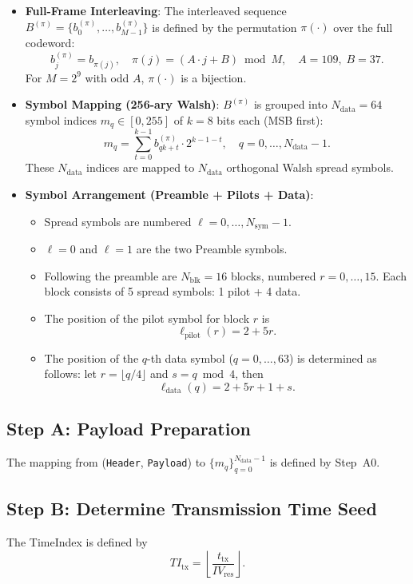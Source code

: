 \documentclass[11pt]{article}
\begin{document}
\begin{itemize}
\item \textbf{Full-Frame Interleaving}: The interleaved sequence $B^{(\pi)}=\{b^{(\pi)}_0,\dots,b^{(\pi)}_{M-1}\}$ is defined by the permutation $\pi(\cdot)$ over the full codeword:
  \[
    b^{(\pi)}_j = b_{\pi(j)},\quad \pi(j) = (A\cdot j + B)\bmod M,\quad A=109,\; B=37.
  \]
  For $M=2^9$ with odd $A$, $\pi(\cdot)$ is a bijection.

\item \textbf{Symbol Mapping (256-ary Walsh)}: $B^{(\pi)}$ is grouped into $N_{\text{data}}=64$ symbol indices $m_q\in[0,255]$ of $k=8$ bits each (MSB first):
  \[
    m_q=\sum_{t=0}^{k-1} b^{(\pi)}_{qk+t}\cdot 2^{k-1-t},\quad q=0,\dots,N_{\text{data}}-1.
  \]
  These $N_{\text{data}}$ indices are mapped to $N_{\text{data}}$ orthogonal Walsh spread symbols.

\item \textbf{Symbol Arrangement (Preamble + Pilots + Data)}:
  \begin{itemize}
  \item Spread symbols are numbered $\ell=0,\dots,N_{\text{sym}}-1$.
  \item $\ell=0$ and $\ell=1$ are the two Preamble symbols.
  \item Following the preamble are $N_{\text{blk}}=16$ blocks, numbered $r=0,\dots,15$. Each block consists of 5 spread symbols: 1 pilot + 4 data.
  \item The position of the pilot symbol for block $r$ is
    \[
      \ell_{\text{pilot}}(r)=2+5r.
    \]
  \item The position of the $q$-th data symbol ($q=0,\dots,63$) is determined as follows: let $r=\lfloor q/4\rfloor$ and $s=q\bmod 4$, then
    \[
      \ell_{\text{data}}(q)=2+5r+1+s.
    \]
  \end{itemize}
\end{itemize}

\subsection{Step A: Payload Preparation}

The mapping from (\texttt{Header}, \texttt{Payload}) to $\{m_q\}_{q=0}^{N_{\text{data}}-1}$ is defined by Step~A0.

\subsection{Step B: Determine Transmission Time Seed}

The TimeIndex is defined by
\[
  \mathit{TI}_{\text{tx}} = \left\lfloor \frac{t_{\text{tx}}}{\mathit{IV}_{\text{res}}} \right\rfloor.
\]
\end{document}
